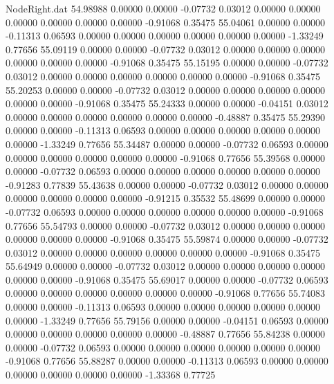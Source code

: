 \begin{filecontents}{NodeRight.dat}
  54.98988    0.00000    0.00000    -0.07732    0.03012    0.00000    0.00000    0.00000    0.00000    0.00000    0.00000   -0.91068    0.35475
  55.04061    0.00000    0.00000    -0.11313    0.06593    0.00000    0.00000    0.00000    0.00000    0.00000    0.00000   -1.33249    0.77656
  55.09119    0.00000    0.00000    -0.07732    0.03012    0.00000    0.00000    0.00000    0.00000    0.00000    0.00000   -0.91068    0.35475
  55.15195    0.00000    0.00000    -0.07732    0.03012    0.00000    0.00000    0.00000    0.00000    0.00000    0.00000   -0.91068    0.35475
  55.20253    0.00000    0.00000    -0.07732    0.03012    0.00000    0.00000    0.00000    0.00000    0.00000    0.00000   -0.91068    0.35475
  55.24333    0.00000    0.00000    -0.04151    0.03012    0.00000    0.00000    0.00000    0.00000    0.00000    0.00000   -0.48887    0.35475
  55.29390    0.00000    0.00000    -0.11313    0.06593    0.00000    0.00000    0.00000    0.00000    0.00000    0.00000   -1.33249    0.77656
  55.34487    0.00000    0.00000    -0.07732    0.06593    0.00000    0.00000    0.00000    0.00000    0.00000    0.00000   -0.91068    0.77656
  55.39568    0.00000    0.00000    -0.07732    0.06593    0.00000    0.00000    0.00000    0.00000    0.00000    0.00000   -0.91283    0.77839
  55.43638    0.00000    0.00000    -0.07732    0.03012    0.00000    0.00000    0.00000    0.00000    0.00000    0.00000   -0.91215    0.35532
  55.48699    0.00000    0.00000    -0.07732    0.06593    0.00000    0.00000    0.00000    0.00000    0.00000    0.00000   -0.91068    0.77656
  55.54793    0.00000    0.00000    -0.07732    0.03012    0.00000    0.00000    0.00000    0.00000    0.00000    0.00000   -0.91068    0.35475
  55.59874    0.00000    0.00000    -0.07732    0.03012    0.00000    0.00000    0.00000    0.00000    0.00000    0.00000   -0.91068    0.35475
  55.64949    0.00000    0.00000    -0.07732    0.03012    0.00000    0.00000    0.00000    0.00000    0.00000    0.00000   -0.91068    0.35475
  55.69017    0.00000    0.00000    -0.07732    0.06593    0.00000    0.00000    0.00000    0.00000    0.00000    0.00000   -0.91068    0.77656
  55.74083    0.00000    0.00000    -0.11313    0.06593    0.00000    0.00000    0.00000    0.00000    0.00000    0.00000   -1.33249    0.77656
  55.79156    0.00000    0.00000    -0.04151    0.06593    0.00000    0.00000    0.00000    0.00000    0.00000    0.00000   -0.48887    0.77656
  55.84238    0.00000    0.00000    -0.07732    0.06593    0.00000    0.00000    0.00000    0.00000    0.00000    0.00000   -0.91068    0.77656
  55.88287    0.00000    0.00000    -0.11313    0.06593    0.00000    0.00000    0.00000    0.00000    0.00000    0.00000   -1.33368    0.77725

\end{filecontents}
